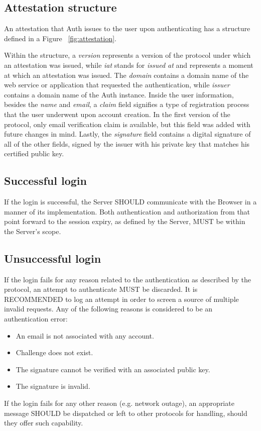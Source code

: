     \subsection{Attestation structure}
    An attestation that Auth issues to the user upon authenticating has a structure defined in a Figure 
    ~\ref{fig:attestation}.
    
    Within the structure, a \textit{version} represents a version of the protocol under which an attestation was issued, 
    while \textit{iat} stands for \textit{issued at} and represents a moment at which an attestation was issued. The 
    \textit{domain} contains a domain name of the web service or application that requested the authentication, while 
    \textit{issuer} contains a domain name of the Auth instance. Inside the user information, besides the \textit{name}
    and \textit{email}, a \textit{claim} field signifies a type of registration process that the user underwent upon 
    account creation. In the first version of the protocol, only email verification claim is available, but this field 
    was added with future changes in mind. Lastly, the \textit{signature} field contains a digital signature of all of 
    the other fields, signed by the issuer with his private key that matches his certified public key. 

    \subsection{Successful login}
    If the login is successful, the Server SHOULD communicate with the Browser in a manner of its implementation. Both 
    authentication and authorization from that point forward to the session expiry, as defined by the Server, MUST be 
    within the Server's scope.

    \subsection{Unsuccessful login}
    If the login fails for any reason related to the authentication as described by the protocol, an attempt to 
    authenticate MUST be discarded. It is RECOMMENDED to log an attempt in order to screen a source of multiple invalid 
    requests. Any of the following reasons is considered to be an authentication error:
        \begin{itemize}
            \item An email is not associated with any account.
            \item Challenge does not exist.
            \item The signature cannot be verified with an associated public key.
            \item The signature is invalid.
        \end{itemize}
    If the login fails for any other reason (e.g. network outage), an appropriate message SHOULD be dispatched or left 
    to other protocols for handling, should they offer such capability.

        
